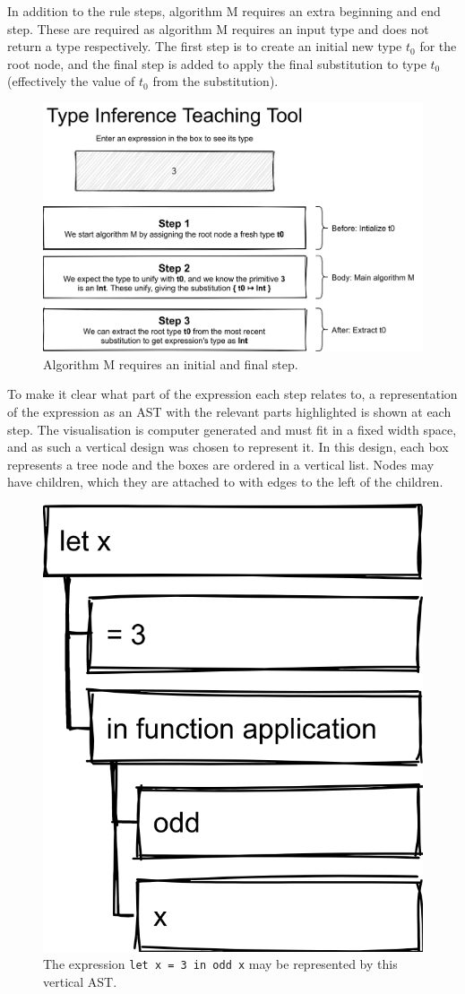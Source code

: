 \documentclass[a4paper,fleqn,oneside,12pt]{report}
\begin{document}
In addition to the rule steps, algorithm M requires an extra beginning and end step. These are required as algorithm M requires an input type and does not return a type respectively. The first step is to create an initial new type $t_0$ for the root node, and the final step is added to apply the final substitution to type $t_0$ (effectively the value of $t_0$ from the substitution).

{\centering \begin{figure}[h!]
  \centering
  \includegraphics[width=0.960\linewidth]{images/image10.png}
  \caption{Algorithm M requires an initial and final step.}
\end{figure} \par}

To make it clear what part of the expression each step relates to, a representation of the expression as an AST with the relevant parts highlighted is shown at each step. The visualisation is computer generated and must fit in a fixed width space, and as such a vertical design was chosen to represent it. In this design, each box represents a tree node and the boxes are ordered in a vertical list. Nodes may have children, which they are attached to with edges to the left of the children.

{\centering \begin{figure}[h!]
  \centering
  \includegraphics[width=0.357\linewidth]{images/image31.png}
  \caption{The expression \texttt{let x = 3 in odd x} may be represented by this vertical AST.}
\end{figure} \par}
\end{document}
